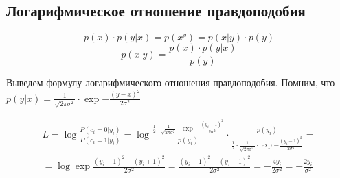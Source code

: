 \documentclass{article}
\begin{document}
\subsection*{Логарифмическое отношение правдоподобия}

$$p(x) \cdot p(y | x) = p(x ^ y) = p(x | y) \cdot p(y)$$
$$p(x | y) = \frac{p(x) \cdot p(y | x)}{p(y)}$$

Выведем формулу логарифмического отношения правдоподобия. Помним, что $p(y | x) = \frac{1}{\sqrt{2 \pi \sigma^2}} \cdot \exp{-\frac{(y - x)^2}{2\sigma^2}}$

\begin{equation*}
\begin{gathered}
L = \log\frac{P(c_i = 0 | y_i)}{P(c_i = 1 | y_i)} = \log{\frac{\frac{1}{2} \cdot \frac{1}{\sqrt{2 \pi \sigma^2}} \cdot \exp{-\frac{(y_i + 1)^2}{2\sigma^2}}}{p(y_i)} \cdot \frac{p(y_i)}{\frac{1}{2} \cdot \frac{1}{\sqrt{2 \pi \sigma^2}} \cdot \exp{-\frac{(y_i - 1)^2}{2\sigma^2}}}} =\\= \log{\exp{\frac{(y_i - 1)^2 - (y_i + 1)^2}{2\sigma^2}}} = \frac{(y_i - 1)^2 - (y_i + 1)^2}{2\sigma^2} = -\frac{4 y_i}{2\sigma^2} = -\frac{2y_i}{\sigma^2}
\end{gathered}
\end{equation*}
\end{document}
